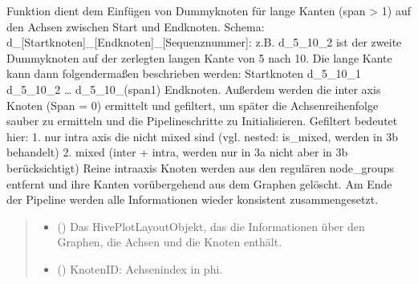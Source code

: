 \documentclass[a4paper,10pt,ngerman]{sphinxmanual}
\begin{document}
\begin{fulllineitems}
\label{\detokenize{api:src.crossing_minimization.subdivide_long_edges}}
\pysigstartsignatures
\pysiglinewithargsret
{}
{\sphinxparamcomma {}\sphinxparamcomma {}\sphinxparamcomma {}}
{}
\pysigstopsignatures
\sphinxAtStartPar
Funktion dient dem Einfügen von Dummyknoten für lange Kanten (span \textgreater{} 1) auf den Achsen zwischen Start\sphinxhyphen{} und Endknoten. Schema: d\_{[}Startknoten{]}\_{[}Endknoten{]}\_{[}Sequenznummer{]}: z.B. d\_5\_10\_2 ist der zweite Dummyknoten auf der zerlegten langen Kante von 5 nach 10. Die lange Kante kann dann folgendermaßen beschrieben werden:
Startknoten \sphinxhyphen{} d\_5\_10\_1 \sphinxhyphen{} d\_5\_10\_2 \sphinxhyphen{} … \sphinxhyphen{} d\_5\_10\_(span\sphinxhyphen{}1) \sphinxhyphen{} Endknoten. Außerdem werden die inter axis Knoten (Span = 0) ermittelt und gefiltert, um später die Achsenreihenfolge sauber zu ermitteln und die Pipelineschritte zu Initialisieren. Gefiltert bedeutet hier:
1. nur intra axis die nicht mixed sind (vgl. nested: is\_mixed, werden in 3b behandelt)
2. mixed (inter + intra, werden nur in 3a nicht aber in 3b berücksichtigt)
Reine intra\sphinxhyphen{}axis Knoten werden aus den regulären node\_groups entfernt und ihre Kanten vorübergehend aus dem Graphen gelöscht. Am Ende der Pipeline werden alle Informationen wieder konsistent zusammengesetzt.
\begin{quote}\begin{description}
\begin{itemize}
\item {} 
\sphinxAtStartPar
{} () \textendash{} Das HivePlotLayout\sphinxhyphen{}Objekt, das die Informationen über den Graphen, die Achsen und die Knoten enthält.

\item {} 
\sphinxAtStartPar
{} () \textendash{} Knoten\sphinxhyphen{}ID: Achsenindex in phi.


\end{itemize}
\end{description}
\end{quote}
\end{fulllineitems}
\end{document}
